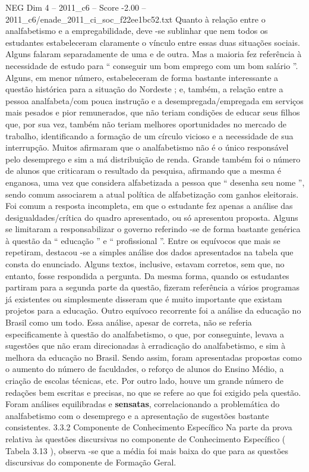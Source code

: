 \begin{textsample}{NEG Dim 4 – 2011\_c6 – Score -2.00 – 2011\_c6/enade\_2011\_ci\_soc\_f22ee1bc52.txt}
Quanto à relação entre o analfabetismo e a empregabilidade, deve -se sublinhar que nem todos os estudantes estabeleceram claramente o vínculo entre essas duas situações sociais.
Alguns falaram separadamente de uma e de outra.
Mas a maioria fez referência à necessidade de estudo para “ conseguir um bom emprego com um bom salário ”.
Alguns, em menor número, estabeleceram de forma bastante interessante a questão histórica para a situação do Nordeste ; e, também, a relação entre a pessoa analfabeta/com pouca instrução e a desempregada/empregada em serviços mais pesados e pior remunerados, que não teriam condições de educar seus filhos que, por sua vez, também não teriam melhores oportunidades no mercado de trabalho, identificando a formação de um círculo vicioso e a necessidade de sua interrupção.
Muitos afirmaram que o analfabetismo não é o único responsável pelo desemprego e sim a má distribuição de renda.
Grande também foi o número de alunos que criticaram o resultado da pesquisa, afirmando que a mesma é enganosa, uma vez que considera alfabetizada a pessoa que “ desenha seu nome ”, sendo comum associarem a atual política de alfabetização com ganhos eleitorais.
Foi comum a resposta incompleta, em que o estudante fez apenas a análise das desigualdades/crítica do quadro apresentado, ou só apresentou proposta.
Alguns se limitaram a responsabilizar o governo referindo -se de forma bastante genérica à questão da “ educação ” e “ profissional ”.
Entre os equívocos que mais se repetiram, destacou -se a simples análise dos dados apresentados na tabela que consta do enunciado.
Alguns textos, inclusive, estavam corretos, sem que, no entanto, fosse respondida a pergunta.
Da mesma forma, quando os estudantes partiram para a segunda parte da questão, fizeram referência a vários programas já existentes ou simplesmente disseram que é muito importante que existam projetos para a educação.
Outro equívoco recorrente foi a análise da educação no Brasil como um todo.
Essa análise, apesar de correta, não se referia especificamente à questão do analfabetismo, o que, por conseguinte, levava a sugestões que não eram direcionadas à erradicação do analfabetismo, e sim à melhora da educação no Brasil.
Sendo assim, foram apresentadas propostas como o aumento do número de faculdades, o reforço de alunos do Ensino Médio, a criação de escolas técnicas, etc.
Por outro lado, houve um grande número de redações bem escritas e precisas, no que se refere ao que foi exigido pela questão.
Foram análises equilibradas e \textbf{sensatas}, correlacionando a problemática do analfabetismo com o desemprego e a apresentação de sugestões bastante consistentes. 3.3.2 Componente de Conhecimento Específico Na parte da prova relativa às questões discursivas no componente de Conhecimento Específico ( Tabela 3.13 ), observa -se que a média foi mais baixa do que para as questões discursivas do componente de Formação Geral.

\end{textsample}
